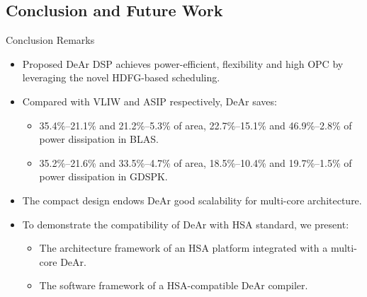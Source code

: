 \documentclass{beamer}
\begin{document}
\begin{CJK}{UTF8}{bkai}
    \section{Conclusion and Future Work}
    \begin{frame}{Conclusion Remarks}
        \begin{itemize}
            \item Proposed DeAr DSP achieves power-efficient, flexibility and high OPC by leveraging the novel HDFG-based scheduling.
            \item Compared with VLIW and ASIP respectively, DeAr saves:
                \begin{itemize}
                    \item 35.4\%--21.1\% and 21.2\%--5.3\% of area, 22.7\%--15.1\% and 46.9\%--2.8\% of power dissipation in BLAS.
                    \item 35.2\%--21.6\% and 33.5\%--4.7\% of area, 18.5\%--10.4\% and 19.7\%--1.5\% of power dissipation in GDSPK.
                \end{itemize}
            \item The compact design endows DeAr good scalability for multi-core architecture.
            \item To demonstrate the compatibility of DeAr with HSA standard, we present:
                \begin{itemize}
                    \item The architecture framework of an HSA platform integrated with a multi-core DeAr.
                    \item The software framework of a HSA-compatible DeAr compiler.
                \end{itemize}
        \end{itemize}
    \end{frame}


\end{CJK}
\end{document}
